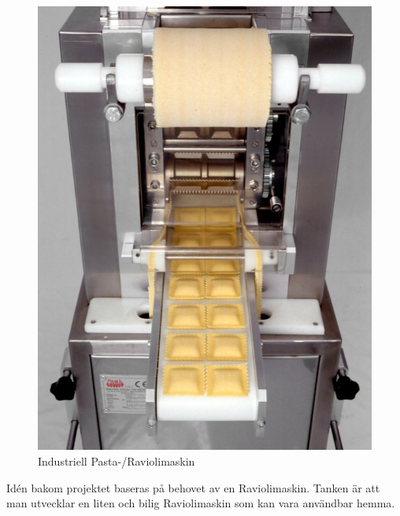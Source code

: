  		\begin{figure}[h]
 			\begin{center}
 				\includegraphics[scale=3]{images/pastamachine.jpg}
 				\caption{Industriell Pasta-/Raviolimaskin}
 				\label{pastamaskin}	
 			\end{center}
 		\end{figure}

Idén bakom projektet baseras på behovet av en Raviolimaskin. Tanken är att man utvecklar en liten och bilig Raviolimaskin som kan vara användbar hemma.		